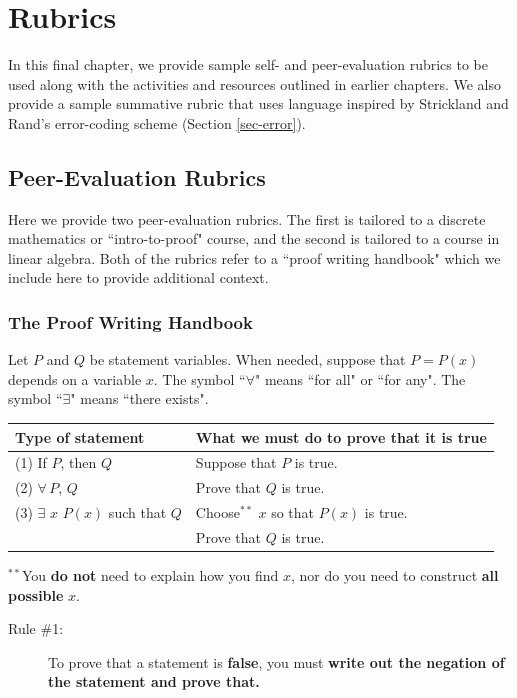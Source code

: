 \documentclass[12pt]{book}
\begin{document}
\chapter{Rubrics}\label{ch-rubrics}

In this final chapter, we provide sample self- and peer-evaluation rubrics to be used along with the activities and resources outlined in earlier chapters. We also provide a sample summative rubric that uses language inspired by Strickland and Rand's error-coding scheme (Section \ref{sec-error}).
\section{Peer-Evaluation Rubrics}\label{sec-peer}
Here we provide two peer-evaluation rubrics.  The first is tailored to a discrete mathematics or ``intro-to-proof" course, and the second is tailored to a course in linear algebra.   Both of the rubrics refer to a ``proof writing handbook" which we include here to provide additional context.
\clearpage

\subsection{The Proof Writing Handbook}
Let $P$ and $Q$ be statement variables. When needed, suppose that $P=P(x)$ depends on a variable $x$.   The symbol ``$\forall$" means ``for all" or ``for any".  The symbol ``$\exists$" means ``there exists".
\begin{center}
\begin{tabular}{l|l}
\textbf{Type of statement} & \textbf{What we must do to prove that it is true}\\
\hline
(1) If $P$, then $Q$ & Suppose that $P$ is true. \\
(2) $\forall\, P$, $Q$ & \quad Prove that $Q$ is true. \\
\hline 
(3) $\exists$ $x$ $P(x)$ such that $Q$ & Choose${}^{**}$ $x$ so that $P(x)$ is true. \\
 & \quad Prove that $Q$ is true.\\	
\end{tabular}
\end{center}
${}^{**}$You \textbf{do not} need to explain how you find $x$, nor do you need to construct \textbf{all possible} $x$.
\begin{description}
\item[Rule \#1:] To prove that a statement is \textbf{false}, you must \textbf{write out the negation of the statement and prove that.}
\end{description}
\end{document}

